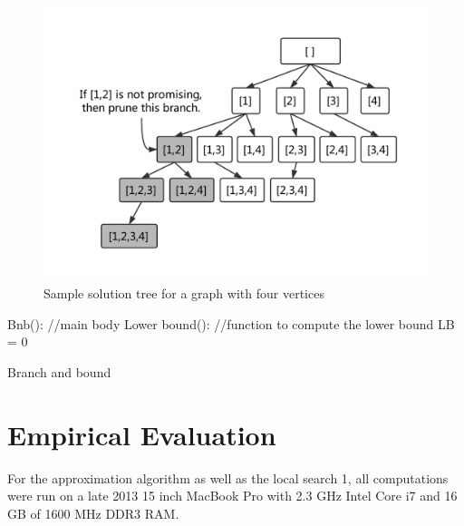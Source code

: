 \begin{figure}[ht]
  \includegraphics[scale=0.5]{tree}
  \caption{Sample solution tree for a graph with four vertices}
  \label{fig:one}
\end{figure}

\begin{algorithm}[ht]
\SetAlgoNoLine
Bnb(): //main body\;
{
}
Lower bound(): //function to compute the lower bound\;
LB = 0\;
\caption{Branch and bound}
\end{algorithm}
\section{Empirical Evaluation}

For the approximation algorithm as well as the local search 1, all computations were run on a late 2013 15 inch MacBook Pro with 2.3 GHz Intel Core i7 and 16 GB of 1600 MHz DDR3 RAM. 


